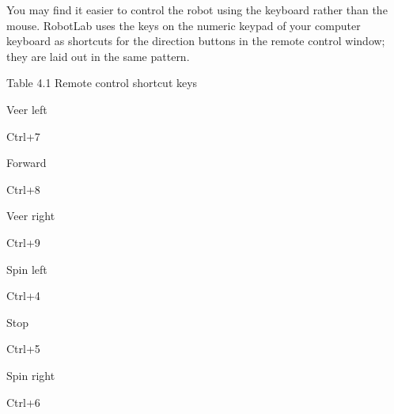 \documentclass[letterpaper,10pt,english]{sphinxmanual}
\begin{document}
You may find it easier to control the robot using the keyboard rather than the mouse. RobotLab uses the keys on the numeric keypad of your computer keyboard as short\sphinxhyphen{}cuts for the direction buttons in the remote control window; they are laid out in the same pattern.





Table 4.1 Remote control short\sphinxhyphen{}cut keys










Veer left

Ctrl+7






Forward

Ctrl+8






Veer right

Ctrl+9










Spin left

Ctrl+4






Stop

Ctrl+5






Spin right

Ctrl+6
\end{document}
